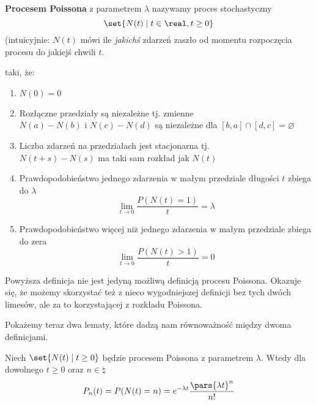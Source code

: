 \begin{definition}
    \label{poisson-process-definition}
    \textbf{Procesem Poissona} z parametrem \( \lambda \) nazywamy proces stochastyczny
    \[ \set{N(t) \mid t \in \real, t \geq 0} \]
    (intuicyjnie: \(N(t)\) mówi ile \textit{jakichś} zdarzeń zaszło od momentu rozpoczęcia procesu do jakiejś chwili \(t\).
    
    taki, że:
    
    \begin{enumerate}
        \item \( N(0) = 0 \)
        
        \item Rozłączne przedziały są niezależne tj. zmienne \\
            \( N(a) - N(b) \) i \( N(c) - N(d) \) są niezależne dla \( [b, a] \cap [d, c] = \varnothing \)
        
        \item Liczba zdarzeń na przedziałach jest stacjonarna tj. \\
            \( N(t + s) - N(s) \) ma taki sam rozkład jak \( N(t) \)
            
        \item Prawdopodobieństwo jednego zdarzenia w małym przedziale długości \( t \) zbiega do \( \lambda  \) \\
            \[ \lim_{t \rightarrow 0} \frac{P(N(t) = 1)}{t} = \lambda \]
            
        \item Prawdopodobieństwo więcej niż jednego zdarzenia w małym przedziale zbiega do zera \\
             \[ \lim_{t \rightarrow 0} \frac{P(N(t) > 1)}{t} = 0 \]
    \end{enumerate}
\end{definition}


Powyższa definicja nie jest jedyną możliwą definicją procesu Poissona. Okazuje się, że możemy skorzystać też z nieco wygodniejszej definicji bez tych dwóch limesów, ale za to korzystającej z rozkładu Poissona.

Pokażemy teraz dwa lematy, które dadzą nam równoważność między dwoma definicjami.


\begin{theorem}[Twierdzenie 8.7 P\&C]
    Niech \( \set{N(t) \mid t \geq 0} \) będzie procesem Poissona z parametrem \( \lambda \). Wtedy dla dowolnego \( t \geq 0 \) oraz \( n \in \natural \)
    \[ 
        P_n(t) = P(N(t) = n) = e^{-\lambda t} \frac{\pars{\lambda t}^n}{n!}
    \]
\end{theorem}

